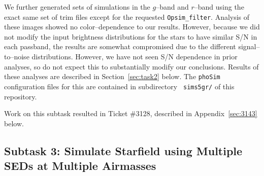 \documentclass[prd, nofootinbib, floatfix, 11pt, tightenlines, times]{article}
\begin{document}
We further generated sets of simulations in the $g$--band and
$r$--band using the exact same set of trim files except for the
requested {\tt Opsim\_filter}.  Analysis of these images showed no
color--dependence to our results.  However, because we did not modify
the input brightness distributions for the stars to have similar S/N
in each passband, the results are somewhat compromised due to the
different signal--to--noise distributions.  However, we have not seen
S/N dependence in prior analyses, so do not expect this to
substantially modify our conclusions.  Results of these analyses are
described in Section~\ref{sec:task2} below.  The {\tt phoSim}
configuration files for this are contained in subdirectory {\tt
  sims5gr/} of this repository.

Work on this subtask resulted in Ticket \#3128, described in
Appendix~\ref{sec:3143} below.

\subsection{Subtask 3: Simulate Starfield using Multiple SEDs at Multiple Airmasses}
\end{document}
